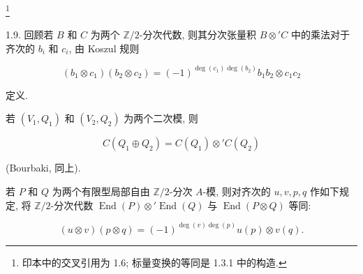 \footnote{印本中的交叉引用为 1.6; 标量变换的等同是 1.3.1 中的构造.}


1.9. 回顾若 $B$ 和 $C$ 为两个 $\mathbb Z/2$-分次代数, 则其分次张量积 $B\otimes' C$ 中的乘法对于齐次的 $b_i$ 和 $c_i$, 由 Koszul 规则

\begin{equation*}
(b_1\otimes c_1)(b_2\otimes c_2)
=(-1)^{\deg(c_1)\deg(b_2)}b_1b_2\otimes c_1c_2
\end{equation*}

定义.

若 $(V_1,Q_1)$ 和 $(V_2,Q_2)$ 为两个二次模, 则

\begin{equation*}
C(Q_1\oplus Q_2)=C(Q_1)\otimes' C(Q_2)
\end{equation*}

(Bourbaki, 同上).

若 $P$ 和 $Q$ 为两个有限型局部自由 $\mathbb Z/2$-分次 $A$-模, 则对齐次的 $u,v,p,q$ 作如下规定, 将 $\mathbb Z/2$-分次代数 $\operatorname{End}(P)\otimes'\operatorname{End}(Q)$ 与 $\operatorname{End}(P\otimes Q)$ 等同:

\begin{equation*}
(u\otimes v)(p\otimes q)
=(-1)^{\deg(v)\deg(p)}u(p)\otimes v(q).
\end{equation*}
